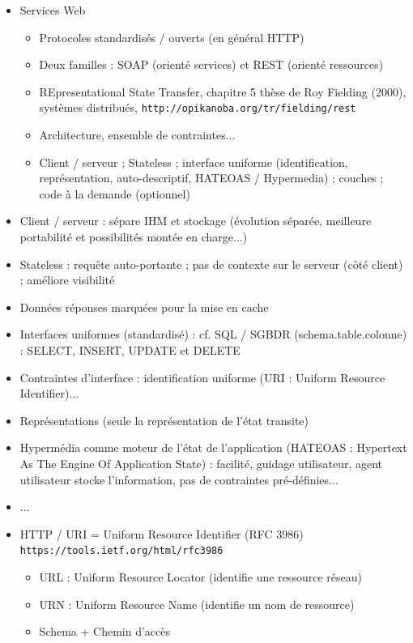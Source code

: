 \documentclass[11pt,twoside,a4paper]{article}
\begin{document}
\begin{landscape}
\begin{multicols}{2}
	\begin{itemize}
		\item Services Web
		\begin{itemize}
			\item Protocoles standardis{\'e}s / ouverts (en g{\'e}n{\'e}ral HTTP)
			\item Deux familles : SOAP (orient{\'e} services) et REST (orient{\'e} ressources)
			\item REpresentational State Transfer, chapitre 5 th{\`e}se de Roy Fielding (2000), syst{\`e}mes distribu{\'e}s, \texttt{http://opikanoba.org/tr/fielding/rest}
			\item Architecture, ensemble de contraintes... 
			\item Client / serveur ; Stateless ; interface uniforme (identification, repr{\'e}sentation, auto-descriptif, HATEOAS / Hypermedia) ; couches ; code {\`a} la demande (optionnel)
		\end{itemize}
		\item Client / serveur : s{\'e}pare IHM et stockage ({\'e}volution s{\'e}par{\'e}e, meilleure portabilit{\'e} et possibilit{\'e}s mont{\'e}e en charge...)
		\item Stateless : requ{\^e}te auto-portante ; pas de contexte sur le serveur (c{\^o}t{\'e} client) ; am{\'e}liore visibilit{\'e}
		\item Donn{\'e}es r{\'e}ponses marqu{\'e}es pour la mise en cache
		\item Interfaces uniformes (standardis{\'e}) : cf. SQL / SGBDR (schema.table.colonne) : SELECT, INSERT, UPDATE et DELETE
		\item Contraintes d'interface : identification uniforme (URI : Uniform Resource Identifier)...
		\item Repr{\'e}sentations (seule la repr{\'e}sentation de l'{\'e}tat transite)
		\item Hyperm{\'e}dia comme moteur de l'{\'e}tat de l'application (HATEOAS : Hypertext As The Engine Of Application State) : facilit{\'e}, guidage utilisateur, agent utilisateur stocke l'information, pas de contraintes pr{\'e}-d{\'e}finies...
		\item ...
		\item HTTP / URI = Uniform Resource Identifier (RFC 3986) \texttt{https://tools.ietf.org/html/rfc3986 }
		\begin{itemize}
			\item URL : Uniform Resource Locator (identifie une ressource r{\'e}seau)
			\item URN : Uniform Resource Name (identifie un nom de ressource)
			\item Schema + Chemin d'acc{\`e}s
		\end{itemize}
		

\end{itemize}
\end{multicols}
\end{landscape}
\end{document}
